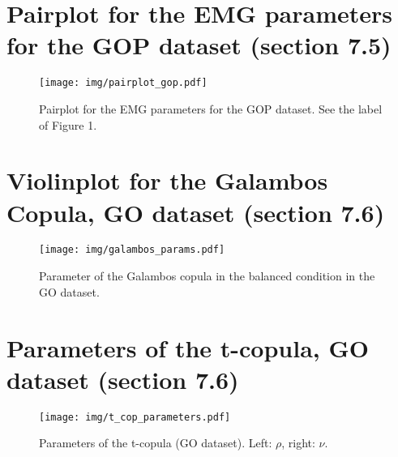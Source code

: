 \documentclass{article}
\begin{document}

\section{Pairplot for the EMG parameters for the GOP dataset (section 7.5)}

\begin{figure}[htbp]
    \centering
    \texttt{[image: img/pairplot\_gop.pdf]}
    \caption{Pairplot for the EMG parameters for the GOP dataset. See the label of Figure 1.}
\end{figure}


\section{Violinplot for the Galambos Copula, GO dataset (section 7.6)}
\begin{figure}[htbp]
    \centering
    \texttt{[image: img/galambos\_params.pdf]}
    \caption{Parameter of the Galambos copula in the balanced condition in the GO dataset.}
    \label{<label>}
\end{figure}


\section{Parameters of the t-copula, GO dataset (section 7.6)}
\begin{figure}[htbp]
    \centering
    \texttt{[image: img/t\_cop\_parameters.pdf]}
    \caption{Parameters of the t-copula (GO dataset). Left: $\rho$, right: $\nu$.}
\end{figure}
\end{document}
